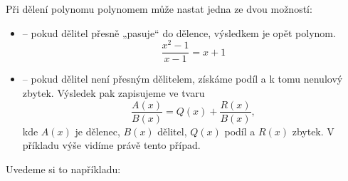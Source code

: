 \documentclass[12pt,a4paper]{article}
\begin{document}
Při dělení polynomu polynomem může nastat jedna ze dvou možností:
\begin{itemize}
    \item {} – pokud dělitel přesně „pasuje“ do dělence, výsledkem je opět polynom.  
    \[
    \frac{x^2 - 1}{x-1} = x+1
    \]
    \item {} – pokud dělitel není přesným dělitelem, získáme podíl a k tomu nenulový zbytek.  
    Výsledek pak zapisujeme ve tvaru
    \[
    \frac{A(x)}{B(x)} = Q(x) + \frac{R(x)}{B(x)},
    \]
    kde $A(x)$ je dělenec, $B(x)$ dělitel, $Q(x)$ podíl a $R(x)$ zbytek.  
    V příkladu výše vidíme právě tento případ.
\end{itemize}

Uvedeme si to napříkladu:
\end{document}
